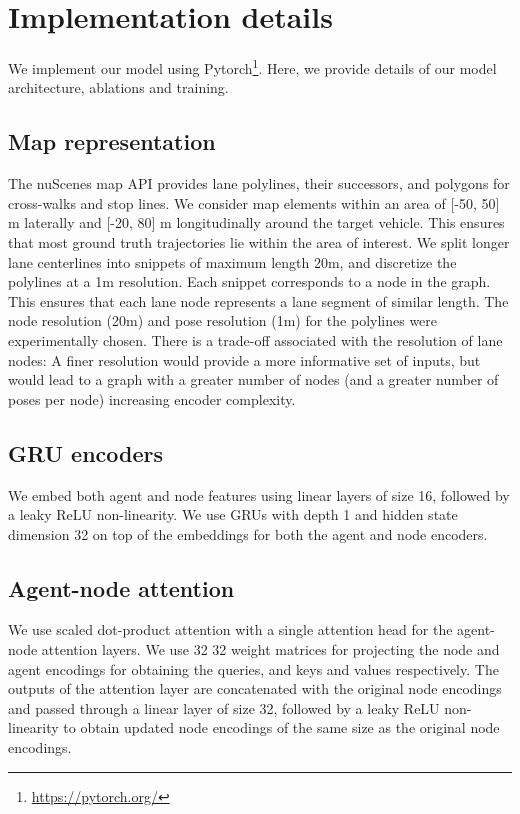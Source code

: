 \documentclass{article}
\begin{document}
\clearpage




  


\newpage
\appendix
\section{Implementation details}
We implement our model using Pytorch\footnote{\href{https://pytorch.org/}{https://pytorch.org/}}. Here, we provide details of our model architecture, ablations and training. 

\subsection{Map representation}
The nuScenes map API provides lane polylines, their successors, and polygons for cross-walks and stop lines. We consider map elements within an area of [-50, 50] m laterally and [-20, 80] m longitudinally around the target vehicle. This ensures that most ground truth trajectories lie within the area of interest. We split longer lane centerlines into snippets of maximum length 20m, and discretize the polylines at a 1m resolution. Each snippet corresponds to a node in the graph. This ensures that each lane node represents a lane segment of similar length. The node resolution (20m) and pose resolution (1m) for the polylines were experimentally chosen. There is a trade-off associated with the resolution of lane nodes: A finer resolution would provide a more informative set of inputs, but would lead to a graph with a greater number of nodes (and a greater number of poses per node) increasing encoder complexity.

\subsection{GRU encoders}
We embed both agent and node features using linear layers of size 16, followed by a leaky ReLU non-linearity. We use GRUs with depth 1 and hidden state dimension 32 on top of the embeddings for both the agent and node encoders.

\subsection{Agent-node attention}
We use scaled dot-product attention with a single attention head for the agent-node attention layers. We use 32  32 weight matrices for projecting the node and agent encodings for obtaining
the queries, and keys and values respectively. The outputs of the attention layer are concatenated with the original node encodings and passed through a linear layer of size 32, followed by a leaky ReLU non-linearity to obtain updated node encodings of the same size as the original node encodings.
\end{document}
